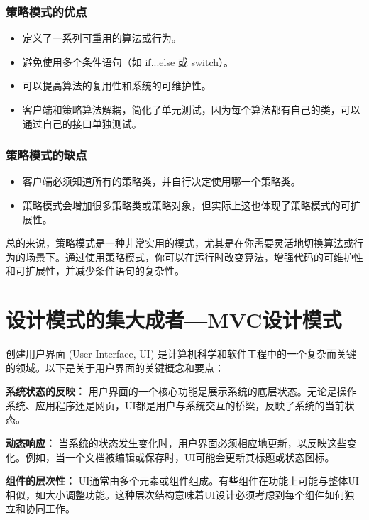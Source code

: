 \subsubsection{策略模式的优点}

\begin{itemize}
	\item 定义了一系列可重用的算法或行为。
	\item 避免使用多个条件语句（如 if...else 或 switch）。
	\item 可以提高算法的复用性和系统的可维护性。
	\item 客户端和策略算法解耦，简化了单元测试，因为每个算法都有自己的类，可以通过自己的接口单独测试。
\end{itemize}

\subsubsection{策略模式的缺点}

\begin{itemize}
	\item 客户端必须知道所有的策略类，并自行决定使用哪一个策略类。
	\item 策略模式会增加很多策略类或策略对象，但实际上这也体现了策略模式的可扩展性。
\end{itemize}

总的来说，策略模式是一种非常实用的模式，尤其是在你需要灵活地切换算法或行为的场景下。通过使用策略模式，你可以在运行时改变算法，增强代码的可维护性和可扩展性，并减少条件语句的复杂性。

\section{设计模式的集大成者---MVC设计模式}

创建用户界面 (User Interface, UI) 是计算机科学和软件工程中的一个复杂而关键的领域。以下是关于用户界面的关键概念和要点：

\textbf{系统状态的反映：}
用户界面的一个核心功能是展示系统的底层状态。无论是操作系统、应用程序还是网页，UI都是用户与系统交互的桥梁，反映了系统的当前状态。

\textbf{动态响应：}
当系统的状态发生变化时，用户界面必须相应地更新，以反映这些变化。例如，当一个文档被编辑或保存时，UI可能会更新其标题或状态图标。

\textbf{组件的层次性：}
UI通常由多个元素或组件组成。有些组件在功能上可能与整体UI相似，如大小调整功能。这种层次结构意味着UI设计必须考虑到每个组件如何独立和协同工作。

